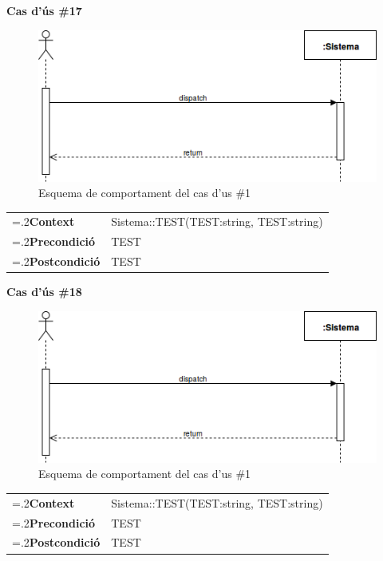 \clearpage
\noindent\textbf{\large Cas d'ús \#17}\\
\begin{figure}[H]
\centering
\includegraphics[scale=0.6]{Figures/casdus_00.png}
\caption{Esquema de comportament del cas d'us \#1}
\end{figure}
\begin{table}[h]
\noindent
\begin{tabularx}{\linewidth}{
>{\hsize=.2\hsize}X%
>{\hsize=0.8\hsize}X%
}
\textbf{Context} 		& Sistema::TEST(TEST:string, TEST:string) \\
\textbf{Precondició} 	& TEST \\
\textbf{Postcondició}	& TEST \\
\end{tabularx}
\label{}
\end{table}

\noindent\textbf{\large Cas d'ús \#18}\\
\begin{figure}[H]
\centering
\includegraphics[scale=0.6]{Figures/casdus_00.png}
\caption{Esquema de comportament del cas d'us \#1}
\end{figure}
\begin{table}[h]
\noindent
\begin{tabularx}{\linewidth}{
>{\hsize=.2\hsize}X%
>{\hsize=0.8\hsize}X%
}
\textbf{Context} 		& Sistema::TEST(TEST:string, TEST:string) \\
\textbf{Precondició} 	& TEST \\
\textbf{Postcondició}	& TEST \\
\end{tabularx}
\label{}
\end{table}

